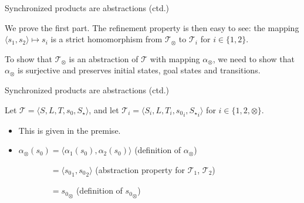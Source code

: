 \documentclass{gkibeamer}
\begin{document}
\begin{frame}{Synchronized products are abstractions (ctd.)}
  \begin{proofstart}
    We prove the first part. The refinement property is then easy to
    see: the mapping $\langle s_1, s_2\rangle \mapsto s_i$ is a strict
    homomorphism from $\mathcal T_{\otimes}$ to $\mathcal T_i$ for $i
    \in \{1, 2\}$.

    \pause
    \medskip

    To show that $\mathcal T_{\otimes}$ is an abstraction of $\mathcal
    T$ with mapping $\alpha_{\otimes}$, we need to show that
    $\alpha_{\otimes}$ is surjective and preserves initial states,
    goal states and transitions.

  \end{proofstart}
\end{frame}

\begin{frame}{Synchronized products are abstractions (ctd.)}
  \begin{proofmid}
    Let $\mathcal T = \langle S, L, T, s_0, S_\star\rangle$, and let
    $\mathcal T_i = \langle S_i, L, T_i, {s_0}_i, {S_\star}_i\rangle$ for
    $i \in \{1, 2, \otimes\}$.

    \begin{itemize}
    \item {} This is given in the
      premise.
      \pause

    \item {}
      
      $\alpha_{\otimes}(s_0) = \langle \alpha_1(s_0), \alpha_2(s_0)\rangle$
      \quad (definition of $\alpha_{\otimes}$)

      $\phantom{\alpha_{\otimes}(s_0)} = \langle {s_0}_1, {s_0}_2 \rangle$
      \quad (abstraction property for $\mathcal T_1$, $\mathcal T_2$)

      $\phantom{\alpha_{\otimes}(s_0)} = {s_0}_{\otimes}$
      \quad (definition of ${s_0}_{\otimes}$)
    \end{itemize}
  \end{proofmid}
\end{frame}
\end{document}
